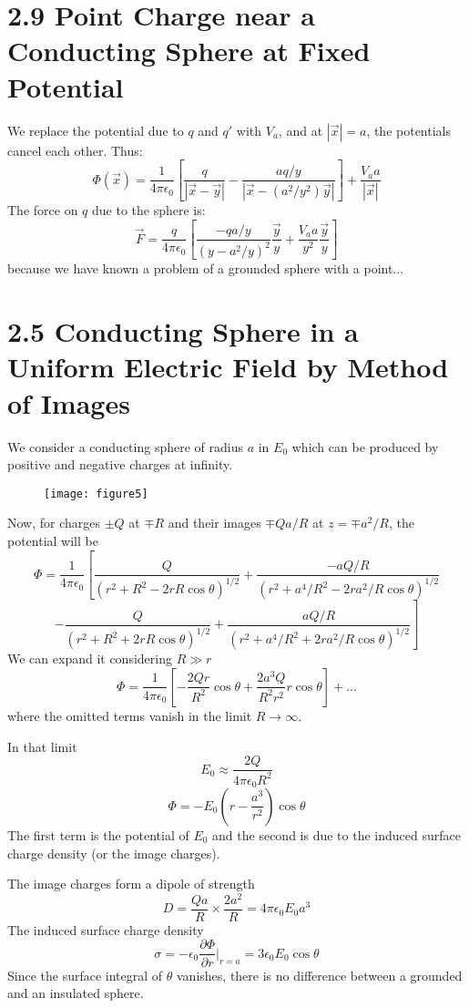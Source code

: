 \documentclass{article}
\begin{document}
	\section*{2.9 Point Charge near a Conducting Sphere at Fixed Potential}
	
	We replace the potential due to $q$ and $q'$ with $V_a$, and at $|\vec{x}|=a$, the potentials cancel each other. Thus:
	$$
	\Phi(\vec{x}) = \frac{1}{4\pi\epsilon_0} \left[ \frac{q}{|\vec{x}-\vec{y}|} - \frac{aq/y}{|\vec{x} - (a^2/y^2)\vec{y}|} \right] + \frac{V_a a}{|\vec{x}|}
	$$
	The force on $q$ due to the sphere is:
	$$
	\vec{F} = \frac{q}{4\pi\epsilon_0} \left[ \frac{-q a/y}{(y-a^2/y)^2} \frac{\vec{y}}{y} + \frac{V_a a}{y^2} \frac{\vec{y}}{y} \right]
	$$
	because we have known a problem of a grounded sphere with a point...
	
	\section*{2.5 Conducting Sphere in a Uniform Electric Field by Method of Images}
	
	We consider a conducting sphere of radius $a$ in $E_0$ which can be produced by positive and negative charges at infinity. 
	
	\begin{figure}[h]
		\centering
		\texttt{[image: figure5]}
		\caption{}
		\label{fig:figure5}
	\end{figure}
	
	Now, for charges $\pm Q$ at $\mp R$ and their images $\mp Qa/R$ at $z=\mp a^2/R$, the potential will be
	$$
	\Phi = \frac{1}{4\pi\epsilon_0} \left[ \frac{Q}{(r^2+R^2-2rR\cos\theta)^{1/2}} + \frac{-aQ/R}{(r^2+a^4/R^2-2ra^2/R\cos\theta)^{1/2}} \right.
	$$
	$$
	\left. - \frac{Q}{(r^2+R^2+2rR\cos\theta)^{1/2}} + \frac{aQ/R}{(r^2+a^4/R^2+2ra^2/R\cos\theta)^{1/2}} \right]
	$$
	We can expand it considering $R \gg r$
	$$
	\Phi = \frac{1}{4\pi\epsilon_0} \left[ -\frac{2Qr}{R^2}\cos\theta + \frac{2a^3Q}{R^2r^2}r\cos\theta \right] + \dots
	$$
	where the omitted terms vanish in the limit $R \to \infty$.
	
	In that limit
	$$
	E_0 \approx \frac{2Q}{4\pi\epsilon_0 R^2}
	$$
	$$
	\Phi = -E_0\left(r - \frac{a^3}{r^2}\right)\cos\theta
	$$
	The first term is the potential of $E_0$ and the second is due to the induced surface charge density (or the image charges).
	
	The image charges form a dipole of strength
	$$
	D = \frac{Qa}{R} \times \frac{2a^2}{R} = 4\pi\epsilon_0 E_0 a^3
	$$
	The induced surface charge density
	$$
	\sigma = -\epsilon_0 \frac{\partial\Phi}{\partial r}\bigg|_{r=a} = 3\epsilon_0 E_0 \cos\theta
	$$
	Since the surface integral of $\theta$ vanishes, there is no difference between a grounded and an insulated sphere.
	
\end{document}
